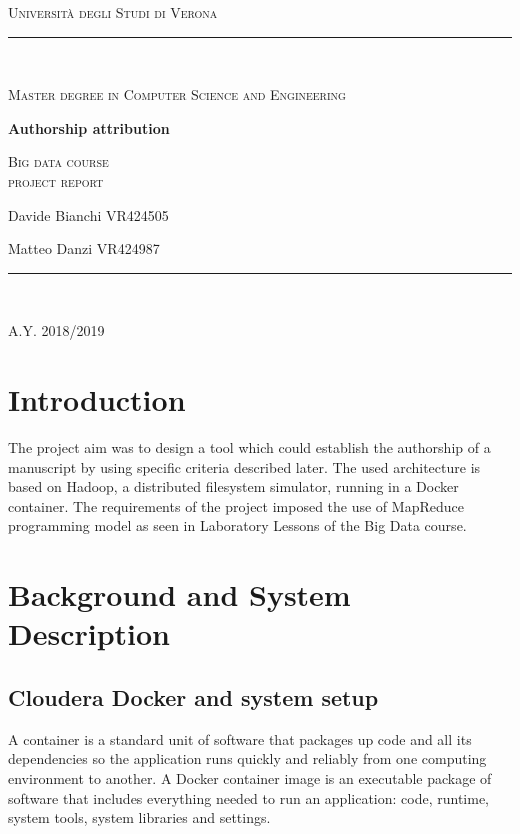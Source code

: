 \documentclass[a4paper,11pt, twoside]{article}
\begin{document}
	\clearpage
	\begin{titlepage}
		\centering
		{\scshape\LARGE Università degli Studi di Verona \par}
		\noindent\rule{\textwidth}{0.5pt}\\
		{\scshape\large Master degree in Computer Science and Engineering\par}
		\vspace{6cm}
		{\huge\bfseries Authorship attribution\par}
		\vspace{1cm}
		{\Large\scshape Big data course\\ \large project report\par}
		\vspace{2cm}
		{\Large Davide Bianchi VR424505\par
		\Large Matteo Danzi VR424987\par}
		\vspace{1cm}
		\vspace{5cm}
		\vspace*{\fill}
		\noindent\rule{\textwidth}{0.5pt}\\
		{\large A.Y. 2018/2019\par}
	\end{titlepage}
	\thispagestyle{empty}
	\newpage
	\tableofcontents
	\newpage
	
	\section{Introduction}
	The project aim was to design a tool which could establish the authorship of a manuscript by using specific criteria described later. 
	The used architecture is based on Hadoop, a distributed filesystem simulator, running in a Docker container. The requirements of the project imposed the use of MapReduce programming model as seen in Laboratory Lessons of the Big Data course.

	\section{Background and System Description}
    \subsection{Cloudera Docker and system setup}
		A container is a standard unit of software that packages up code and all its dependencies so the application runs quickly and reliably from one computing environment to another. A Docker container image is an executable package of software that includes everything needed to run an application: code, runtime, system tools, system libraries and settings.
\end{document}
